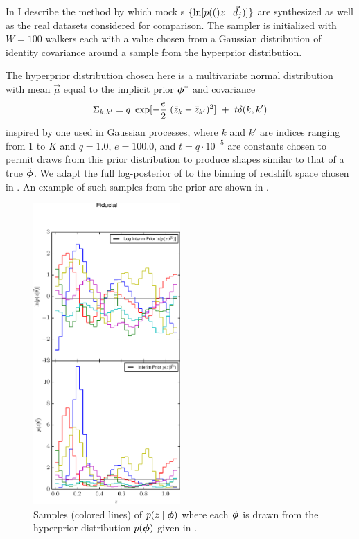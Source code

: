 In  I describe the method by which mock \pzpdf s $\{\ln[p(()z \mid \vec{d}_{j})]\}$ are synthesized as well as the real datasets considered for comparison.  
The sampler is initialized with $W=100$ walkers each with a value chosen from a Gaussian distribution of identity covariance around a sample from the hyperprior distribution.  

The hyperprior distribution chosen here is a multivariate normal distribution with mean $\vec{\mu}$ equal to the implicit prior ${\boldsymbol{\phi}}^{*}$ and covariance
\begin{equation}
\eqlabel{eqn:priorcov}
\Sigma_{k,k'} = q\ \exp[-\frac{e}{2}\ (\bar{z}_{k}-\bar{z}_{k'})^{2}]\ +\ t\delta(k,k')
\end{equation}
inspired by one used in Gaussian processes, where $k$ and $k'$ are indices ranging from $1$ to $K$ and $q=1.0$, $e=100.0$, and $t=q\cdot10^{-5}$ are constants chosen to permit draws from this prior distribution to produce shapes similar to that of a true $\tilde{{\boldsymbol{\phi}}}$.  
We adapt the full log-posterior of  to the binning of redshift space chosen in .
An example of such samples from the prior are shown in .

\begin{figure}
	\includegraphics[width=0.5\textwidth]{figures/chippr/null_priorsamps.pdf}
	\caption{Samples (colored lines) of $p(z \mid {\ensuremath{\boldsymbol{\phi}}})$ where each ${\boldsymbol{\phi}}$ is drawn from the hyperprior distribution $p({\boldsymbol{\phi}})$ given in .}
	\label{fig:prior}
\end{figure}

